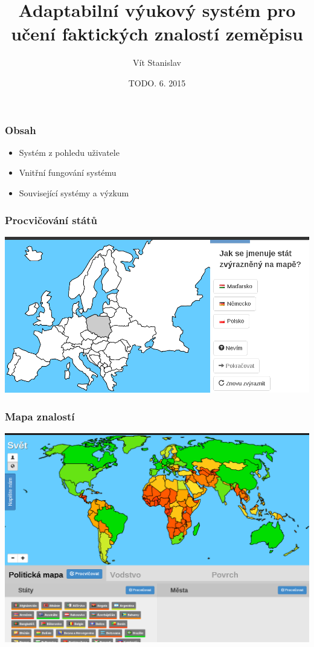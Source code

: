 \documentclass[xcolor=svgnames]{beamer}
\title[slepemapy.cz]{Adaptabilní výukový systém pro učení faktických znalostí zeměpisu}
\author{Vít Stanislav}
\institute{Fakulta informatiky Masarykovy univerzity}      %
\date{TODO. 6. 2015}
\begin{document}
\frame[plain]{\titlepage}
\begin{frame}
	\frametitle{Obsah}
  \begin{itemize}
  \huge \item Systém z pohledu uživatele
  \huge \item Vnitřní fungování systému
  \huge \item Související systémy a výzkum
  \end{itemize}
\end{frame}
\begin{frame}
	\frametitle{Procvičování států}
   \includegraphics[width=\textwidth]{img/practice-example-cs.png}
\end{frame}
\begin{frame}
	\frametitle{Mapa znalostí}
   \includegraphics[width=\textwidth]{img/knowledge-map-world.png}
\end{frame}
\end{document}
